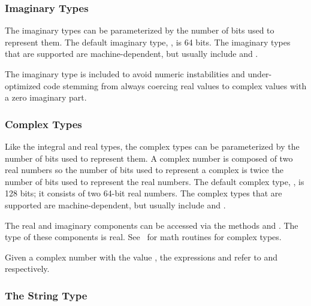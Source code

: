 \subsubsection{Imaginary Types}
\label{Imaginary_Types}

The imaginary types can be parameterized by the number of bits used to
represent them.  The default imaginary type, , is 64 bits.
The imaginary types that are supported are machine-dependent, but
usually include  and .

\begin{rationale}
The imaginary type is included to avoid numeric instabilities and
under-optimized code stemming from always coercing real values to
complex values with a zero imaginary part.
\end{rationale}

\subsubsection{Complex Types}
\label{Complex_Types}

Like the integral and real types, the complex types can be
parameterized by the number of bits used to represent them.  A complex
number is composed of two real numbers so the number of bits used to
represent a complex is twice the number of bits used to represent the
real numbers.  The default complex type, , is 128 bits;
it consists of two 64-bit real numbers.  The complex types that are
supported are machine-dependent, but usually
include  and .

The real and imaginary components can be accessed via the methods
 and .  The type of these components is real.
See~ for math routines for complex types.

%
%

\begin{example}
Given a complex number  with the value , the
expressions  and  refer to 
and  respectively.
\end{example}

\subsubsection{The String Type}
\label{The_String_Type}

